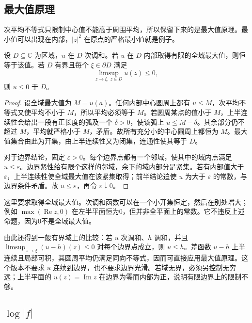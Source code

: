 \subsection{最大值原理}
\label{b3:subsec:150303}

次平均不等式只限制中心值不能高于周围平均，所以保留下来的是最大值原理。最小值可以出现在内部，\(|z|^2\) 在原点的严格最小值就是例子。
\begin{proposition}[次调和函数的最大值原理]\label{b3:prop:15-subharmonic-maximum}
设 \(D\subseteq\mathbb C\) 为区域，\(u\) 在 \(D\) 次调和。若 \(u\) 在 \(D\) 内部取得有限的全域最大值，则恒等于该值。若 \(D\) 有界且每个 \(\xi\in\partial D\) 满足
\[
 \limsup_{z\to\xi,\ z\in D}u(z)\le0,
\]
则 \(u\le0\) 于 \(D\)。
\end{proposition}
\begin{proof}
设全域最大值为 \(M=u(a)\)。任何内部中心圆周上都有 \(u\le M\)，次平均不等式又使平均不小于 \(M\)，所以平均必须等于 \(M\)。若圆周某点的值小于 \(M\)，上半连续性会给出一段有正长度的弧及一个 \(\delta>0\)，使该弧上 \(u\le M-\delta\)。其余部分仍不超过 \(M\)，平均就严格小于 \(M\)，矛盾。故所有充分小的中心圆周上都恒为 \(M\)。最大值集合由此为开集，由上半连续性又为闭集，连通性使其等于 \(D\)。

对于边界结论，固定 \(\varepsilon>0\)。每个边界点都有一个邻域，使其中的域内点满足 \(u\le\varepsilon\)。边界紧性给有限个这样的邻域，余下的域内部分是紧集。若有内部值大于 \(\varepsilon\)，上半连续性使全域最大值在该紧集取得；前半结论迫使 \(u\) 为大于 \(\varepsilon\) 的常数，与边界条件矛盾。故 \(u\le\varepsilon\)，再令 \(\varepsilon\downarrow0\)。
\end{proof}
这里要求取得全域最大值。次调和函数可以在一个小开集恒定，然后在别处增大；例如 \(\max(\operatorname{Re}z,0)\) 在左半平面恒为0，但并非全平面上的常数。它不违反上述命题，因为0不是全域最大值。

\ProseParagraphBreak

由此还得到一般有界域上的比较：若 \(u\) 次调和、\(h\) 调和，并且 \(\limsup_{z\to\xi}(u-h)(z)\le0\) 对每个边界点成立，则 \(u\le h\)。差函数 \(u-h\) 上半连续且局部可积，其圆周平均仍满足同向不等式，因而可直接应用最大值原理。这个版本不要求 \(u\) 连续到边界，也不要求边界光滑。若域无界，必须另控制无穷远；上半平面的 \(u(z)=\operatorname{Im}z\) 在边界为零而内部为正，说明有限边界上的限制不够。

\subsection{\texorpdfstring{\(\log|f|\)}{log|f|}}
\label{b3:subsec:150304}

